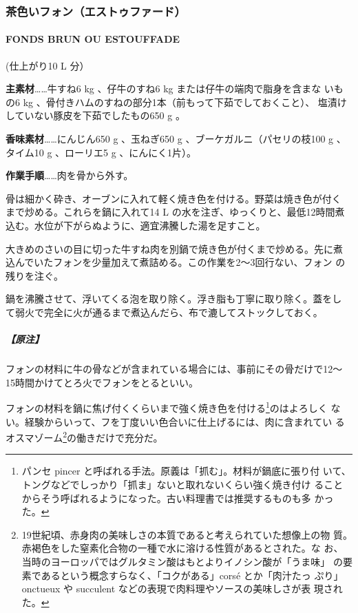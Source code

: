 \documentclass[twoside,12Q,b5j]{escoffierltjsbook}
\newenvironment{recette}{\begin{multicols}{2}}{\end{multicols}}
\begin{document}
\begin{recette}

  
\subsubsection{茶色いフォン（エストゥファード）}\label{ux8336ux8272ux3044ux30d5ux30a9ux30f3ux30a8ux30b9ux30c8ux30a5ux30d5ux30a1ux30fcux30c9}

\paragraph{FONDS BRUN OU ESTOUFFADE}\label{fonds-brun-ou-estouffade}


(仕上がり10 L 分）

\textbf{主素材}\ldots{}\ldots{}牛すね6 kg 、仔牛のすね6 kg
または仔牛の端肉で脂身を含まな いもの6 kg
、骨付きハムのすねの部分1本（前もって下茹でしておくこと）、
塩漬けしていない豚皮を下茹でしたもの650 g 。

\textbf{香味素材}\ldots{}\ldots{}にんじん650 g 、玉ねぎ650 g
、ブーケガルニ（パセリの枝100 g 、 タイム10 g 、ローリエ5 g
、にんにく1片）。

\textbf{作業手順}\ldots{}\ldots{}肉を骨から外す。

骨は細かく砕き、オーブンに入れて軽く焼き色を付ける。野菜は焼き色が付く
まで炒める。これらを鍋に入れて14 L の水を注ぎ、ゆっくりと、最低12時間煮
込む。水位が下がらぬように、適宜沸騰した湯を足すこと。

大きめのさいの目に切った牛すね肉を別鍋で焼き色が付くまで炒める。先に煮
込んでいたフォンを少量加えて煮詰める。この作業を2〜3回行ない、フォン
の残りを注ぐ。

鍋を沸騰させて、浮いてくる泡を取り除く。浮き脂も丁寧に取り除く。蓋をし
て弱火で完全に火が通るまで煮込んだら、布で漉してストックしておく。

\subparagraph{【原注】}\label{ux539fux6ce8}

フォンの材料に牛の骨などが含まれている場合には、事前にその骨だけで12〜
15時間かけてとろ火でフォンをとるといい。

フォンの材料を鍋に焦げ付くくらいまで強く焼き色を付ける\footnote{パンセ
  pincer と呼ばれる手法。原義は「抓む」。材料が鍋底に張り付
  いて、トングなどでしっかり「抓ま」ないと取れないくらい強く焼き付け
  ることからそう呼ばれるようになった。古い料理書では推奨するものも多
  かった。}のはよろしく
ない。経験からいって、フを丁度いい色合いに仕上げるには、肉に含まれてい
るオスマゾーム\footnote{19世紀頃、赤身肉の美味しさの本質であると考えられていた想像上の物
  質。赤褐色をした窒素化合物の一種で水に溶ける性質があるとされた。な
  お、当時のヨーロッパではグルタミン酸はもとよりイノシン酸が「うま味」
  の要素であるという概念すらなく、「コクがある」corsé とか「肉汁たっ
  ぷり」onctueux や succulent などの表現で肉料理やソースの美味しさが表
  現された。}の働きだけで充分だ。


\end{recette}
\end{document}
